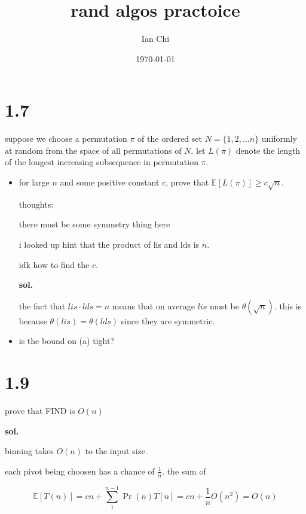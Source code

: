 \documentclass{article}
\title{rand algos practoice}
\author{Ian Chi}
\date{\today}
\newcommand{\sol}{\textbf{sol.}}
\begin{document}
\maketitle

\section{1.7}

suppose we choose a permutation \(\pi\) of the ordered set \(N=\{1,2,\dots n\}\) uniformly at random from the space of all permutations of \(N\). let  \(L(\pi)\) denote the length of the longest increasing subsequence in permutation \(\pi\).
\begin{itemize}
    \item for large \(n\) and some positive constant \(c\), prove that \(\mathbb{E}[L(\pi)]\geq c\sqrt{n}\). 
    
    thoughts:

    there must be some symmetry thing here
    
    i looked up hint that the product of lis and lds is \(n\).

    idk how to find the \(c\). 

    \sol

    the fact that \(lis \cdot lds = n\) means that on average \(lis\) must be \(\theta(\sqrt n)\). this is because \(\theta(lis) = \theta (lds)\) since they are symmetric. 

    




    \item is the bound on (a) tight?   
\end{itemize}

\section {1.9}

prove that FIND is \(O(n)\)

\sol  

binning takes \(O(n)\) to the input size. 

each pivot being choosen has a chance of \(\frac{1}{n}\). the sum of 

\begin{equation}
    \mathbb E [T(n)] = cn+\sum_1^{n-1}\Pr(n)T[n] = cn+\frac{1}{n}O(n^2) = O(n)
\end{equation}

\end{document}
